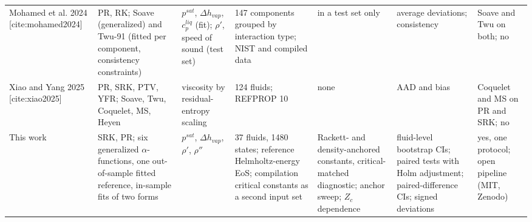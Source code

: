 \begin{table}[H]
\begin{tabular}{p{2.3cm}p{2.9cm}p{2.0cm}p{2.6cm}p{2.0cm}p{2.3cm}p{2.1cm}}
Mohamed et al. 2024 [cite:mohamed2024] & PR, RK; Soave (generalized) and Twu-91 (fitted per component, consistency constraints) & $p^{sat}$, $\Delta h_{vap}$, $c_p^{liq}$ (fit); $\rho'$, speed of sound (test set) & 147 components grouped by interaction type; NIST and compiled data & in a test set only & average deviations; consistency & Soave and Twu on both; no \\
Xiao and Yang 2025 [cite:xiao2025] & PR, SRK, PTV, YFR; Soave, Twu, Coquelet, MS, Heyen & viscosity by residual-entropy scaling & 124 fluids; REFPROP 10 & none & AAD and bias & Coquelet and MS on PR and SRK; no \\
This work & SRK, PR; six generalized $\alpha$-functions, one out-of-sample fitted reference, in-sample fits of two forms & $p^{sat}$, $\Delta h_{vap}$, $\rho'$, $\rho''$ & 37 fluids, 1480 states; reference Helmholtz-energy EoS; compilation critical constants as a second input set & Rackett- and density-anchored constants, critical-matched diagnostic; anchor sweep; $Z_c$ dependence & fluid-level bootstrap CIs; paired tests with Holm adjustment; paired-difference CIs; signed deviations & yes, one protocol; open pipeline (MIT, Zenodo) \\
\bottomrule
\end{tabular}
\end{table}
